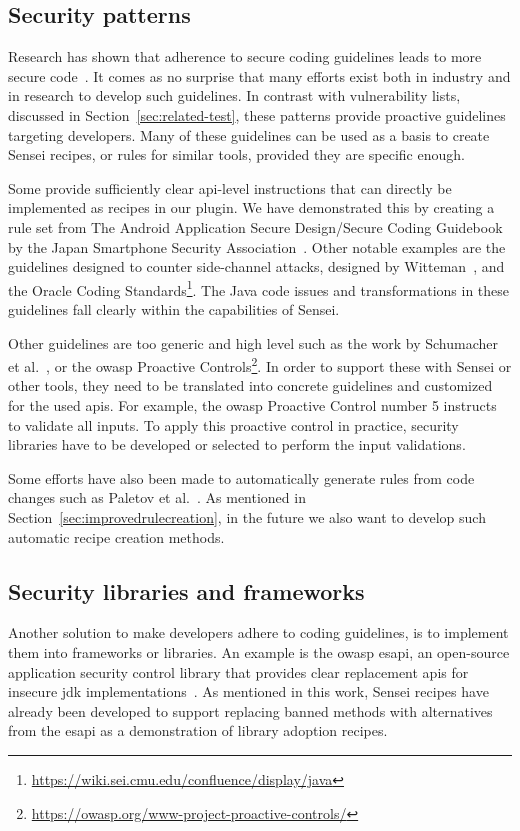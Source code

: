 \subsection{Security patterns}
Research has shown that adherence to secure coding guidelines leads to more secure code~\cite{lipfordimpact,votipka2020understanding}.
It comes as no surprise that many efforts exist both in industry and in research to develop such guidelines.
In contrast with vulnerability lists, discussed in Section~\ref{sec:related-test}, these patterns provide proactive guidelines targeting developers.
Many of these guidelines can be used as a basis to create Sensei recipes, or rules for similar tools, provided they are specific enough.

Some provide sufficiently clear \gls{api}-level instructions that can directly be implemented as recipes in our plugin.
We have demonstrated this by creating a rule set from The Android Application Secure Design/Secure Coding Guidebook by the Japan Smartphone Security Association~\cite{jssec}.
Other notable examples are the guidelines designed to counter side-channel attacks, designed by Witteman~\cite{witteman2008secure}, and the Oracle Coding Standards\footnote{\url{https://wiki.sei.cmu.edu/confluence/display/java}}.
The Java code issues and transformations in these guidelines fall clearly within the capabilities of Sensei.

Other  guidelines are too generic and high level such as the work by Schumacher et al.~\cite{schumacher2013security}, or the \gls{owasp} Proactive Controls\footnote{\url{https://owasp.org/www-project-proactive-controls/}}.
In order to support these with Sensei or other tools, they need to be translated into concrete guidelines and customized for the used \glspl{api}.
For example, the \gls{owasp} Proactive Control number 5 instructs to validate all inputs.
To apply this proactive control in practice, security libraries have to be developed or selected to perform the input validations.

Some efforts have also been made to automatically generate rules from code changes such as Paletov et al.~\cite{paletov2018inferring}.
As mentioned in Section~\ref{sec:improvedrulecreation}, in the future we also want to develop such automatic recipe creation methods.

\subsection{Security libraries and frameworks}
Another solution to make developers adhere to coding guidelines, is to implement them into frameworks or libraries.
An example is the \gls{owasp} \gls{esapi}, an open-source application security control library that provides clear replacement \glspl{api} for insecure \gls{jdk} implementations~\cite{ESAPI}.
As mentioned in this work, Sensei recipes have already been developed to support replacing banned methods with alternatives from the \gls{esapi} as a demonstration of library adoption recipes. 

